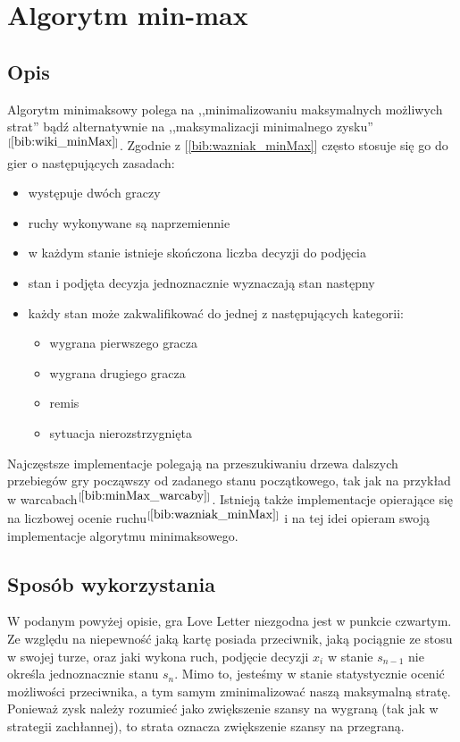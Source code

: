 \section{Algorytm min-max}
\label{sec:minmax}
\subsection{Opis}
Algorytm minimaksowy polega na ,,minimalizowaniu maksymalnych możliwych strat'' bądź alternatywnie na ,,maksymalizacji minimalnego zysku''$^{[\ref{bib:wiki_minMax}]}$. Zgodnie z [\ref{bib:wazniak_minMax}] często stosuje się go do gier o następujących zasadach:
\begin{itemize}
	\item występuje dwóch graczy
	\item ruchy wykonywane są naprzemiennie
	\item w każdym stanie istnieje skończona liczba decyzji do podjęcia
	\item stan i podjęta decyzja jednoznacznie wyznaczają stan następny
	\item każdy stan może zakwalifikować do jednej z następujących kategorii:
	\begin{itemize}
		\item wygrana pierwszego gracza
		\item wygrana drugiego gracza
		\item remis
		\item sytuacja nierozstrzygnięta
	\end{itemize}
\end{itemize}
Najczęstsze implementacje polegają na przeszukiwaniu drzewa dalszych przebiegów gry począwszy od zadanego stanu początkowego, tak jak na przykład w warcabach$^{[\ref{bib:minMax_warcaby}]}$. Istnieją także implementacje opierające się na liczbowej ocenie ruchu$^{[\ref{bib:wazniak_minMax}]}$ i na tej idei opieram swoją implementacje algorytmu minimaksowego.

\subsection{Sposób wykorzystania}
W podanym powyżej opisie, gra Love Letter niezgodna jest w punkcie czwartym. Ze względu na niepewność jaką kartę posiada przeciwnik, jaką pociągnie ze stosu w swojej turze, oraz jaki wykona ruch, podjęcie decyzji $x_i$ w stanie $s_{n-1}$ nie określa jednoznacznie stanu $s_n$. Mimo to, jesteśmy w stanie statystycznie ocenić możliwości przeciwnika, a tym samym zminimalizować naszą maksymalną stratę. Ponieważ zysk należy rozumieć jako zwiększenie szansy na wygraną (tak jak w strategii zachłannej), to strata oznacza zwiększenie szansy na przegraną. 

